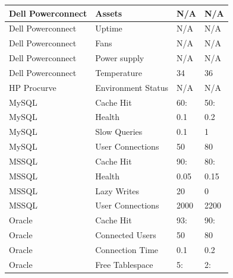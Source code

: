 \begin{table}
\begin{center}
\begin{tabular}{| l | l | l | l |}
	Dell Powerconnect	& Assets			& N/A	& N/A \\ \hline
	Dell Powerconnect	& Uptime			& N/A	& N/A \\ \hline
	Dell Powerconnect	& Fans				& N/A	& N/A \\ \hline
	Dell Powerconnect	& Power supply			& N/A	& N/A \\ \hline
	Dell Powerconnect	& Temperature			& 34	& 36 \\ \hline
	HP Procurve		& Environment Status		& N/A	& N/A \\ \hline
	MySQL			& Cache Hit			& 60: 	& 50: \\ \hline
	MySQL			& Health			& 0.1	& 0.2 \\ \hline
	MySQL			& Slow Queries			& 0.1	& 1 \\ \hline 
	MySQL			& User Connections		& 50	& 80 \\ \hline
	MSSQL			& Cache Hit			& 90:	& 80: \\ \hline
	MSSQL			& Health			& 0.05	& 0.15 \\ \hline
	MSSQL			& Lazy Writes			& 20	& 0 \\ \hline
	MSSQL			& User Connections		& 2000	& 2200 \\ \hline
	Oracle			& Cache Hit			& 93:	& 90: \\ \hline
	Oracle			& Connected Users		& 50	& 80 \\ \hline
	Oracle			& Connection Time		& 0.1	& 0.2 \\ \hline
	Oracle			& Free Tablespace		& 5:	& 2: \\ \hline
\end{tabular}
\label{objekt_varsling}
\end{center}
\end{table}

